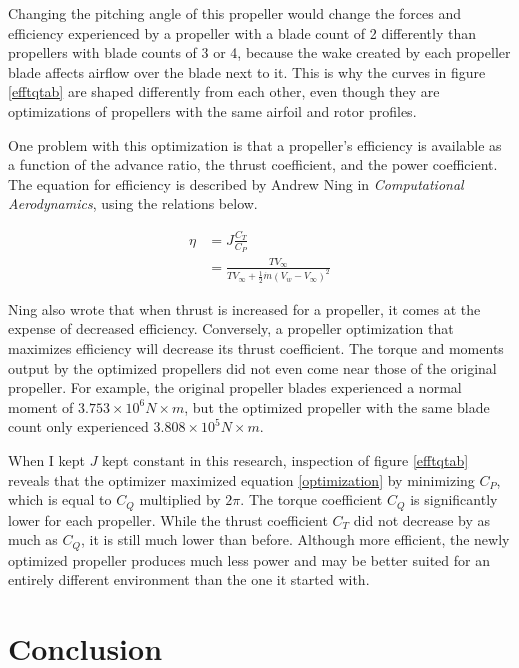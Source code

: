 \documentclass[journal ]{new-aiaa}
\begin{document}
Changing the pitching angle of this propeller would change the forces and efficiency experienced by a propeller with a blade count of 2 differently than propellers with blade counts of 3 or 4, because the wake created by each propeller blade affects airflow over the blade next to it. This is why the curves in figure \eqref{efftqtab} are shaped differently from each other, even though they are optimizations of propellers with the same airfoil and rotor profiles.

One problem with this optimization is that a propeller's efficiency is available as a function of the advance ratio, the thrust coefficient, and the power coefficient. The equation for efficiency is described by Andrew Ning in \emph{Computational Aerodynamics}\cite{ComAer}, using the relations below.

\begin{equation}
	\begin{aligned}
	\eta & = J \frac{C_{T}}{C_{P}} \\
	& = \frac{T V_{\infty}}{T V_{\infty} + \frac{1}{2} \dot{m} (V_{w} - V_{\infty})^{2}}
	\end{aligned}
\label{etqeq}
\end{equation}

Ning also wrote that when thrust is increased for a propeller, it comes at the expense of decreased efficiency\cite{ComAer}. Conversely, a propeller optimization that maximizes efficiency will decrease its thrust coefficient. The torque and moments output by the optimized propellers did not even come near those of the original propeller. For example, the original propeller blades experienced a normal moment of $3.753 \times 10^{6}N \times m$, but the optimized propeller with the same blade count only experienced $3.808 \times 10^{5} N \times m$.

When I kept $J$ kept constant in this research, inspection of figure \eqref{efftqtab} reveals that the optimizer maximized equation \eqref{optimization} by minimizing $C_{P}$, which is equal to $C_{Q}$ multiplied by $2 \pi$. The torque coefficient $C_{Q}$ is significantly lower for each propeller. While the thrust coefficient $C_{T}$ did not decrease by as much as $C_{Q}$, it is still much lower than before. Although more efficient, the newly optimized propeller produces much less power and may be better suited for an entirely different environment than the one it started with.


\section{Conclusion}
\end{document}
